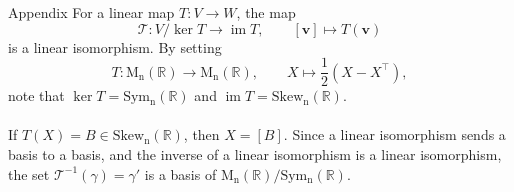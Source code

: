 \documentclass{beamer}
\def\image{\operatorname{im}}
\def\kernel{\operatorname{ker}}
\def\MnR{\operatorname{M_n(\mathbb{R})}}
\def\Sym{\operatorname{Sym_n(\mathbb{R})}}
\def\Skew{\operatorname{Skew_n(\mathbb{R})}}
\def\v{\bm{v}}
\begin{document}
        \begin{frame}[t]{Appendix}
                For a linear map $T \colon V \to W$, the map
                \[
                        \mathscr{T}\colon V/\kernel{T} \to \image{T}, \qquad [\v] \mapsto T(\v)
                \]
                is a linear isomorphism. By setting
                \[
                        T\colon \MnR \to \MnR, \qquad X \mapsto \frac{1}{2}(X - X^\top),
                \]
                note that $\kernel{T} = \Sym$ and $\image{T} = \Skew$. \\~\\

                If $T(X) = B \in \Skew$, then $X = [B]$. Since a linear isomorphism sends a basis to a basis, and the inverse of a linear isomorphism
                is a linear isomorphism, the set $\mathscr{T}^{-1}(\gamma) = \gamma'$ is a basis of $\MnR/\Sym$.
        \end{frame}
\end{document}
